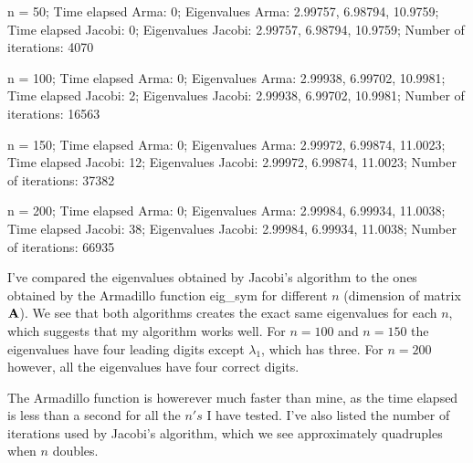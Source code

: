 \documentclass[a4paper,12pt, english]{article}
\begin{document}
n = 50; Time elapsed Arma: 0; Eigenvalues Arma: 2.99757, 6.98794, 10.9759; Time elapsed Jacobi: 0;
Eigenvalues Jacobi: 2.99757, 6.98794, 10.9759; Number of iterations: 4070

n = 100; Time elapsed Arma: 0; Eigenvalues Arma: 2.99938, 6.99702, 10.9981; Time elapsed Jacobi: 2;
Eigenvalues Jacobi: 2.99938, 6.99702, 10.9981; Number of iterations: 16563

n = 150; Time elapsed Arma: 0; Eigenvalues Arma: 2.99972, 6.99874, 11.0023; Time elapsed Jacobi: 12;
Eigenvalues Jacobi: 2.99972, 6.99874, 11.0023; Number of iterations: 37382

n = 200; Time elapsed Arma: 0; Eigenvalues Arma: 2.99984, 6.99934, 11.0038; Time elapsed Jacobi: 38;
Eigenvalues Jacobi: 2.99984, 6.99934, 11.0038; Number of iterations: 66935

I've compared the eigenvalues obtained by Jacobi's algorithm to the ones obtained by the Armadillo 
function eig_sym for different $n$ (dimension of matrix ${\bf A}$). We see that both algorithms creates the 
exact
same eigenvalues for each $n$, which suggests that my algorithm works well. For $n = 100$ and $n = 150$ 
the eigenvalues 
have four leading digits except $\lambda_1$, which has three. For $n = 200$ however, all the 
eigenvalues have four
correct digits. 

The Armadillo function is howerever much faster than mine, as the time elapsed is less than a 
second for all 
the $n's$ I 
have tested. I've also listed the number of iterations used by Jacobi's algorithm, which we 
see approximately quadruples
when $n$ doubles.
\end{document}
